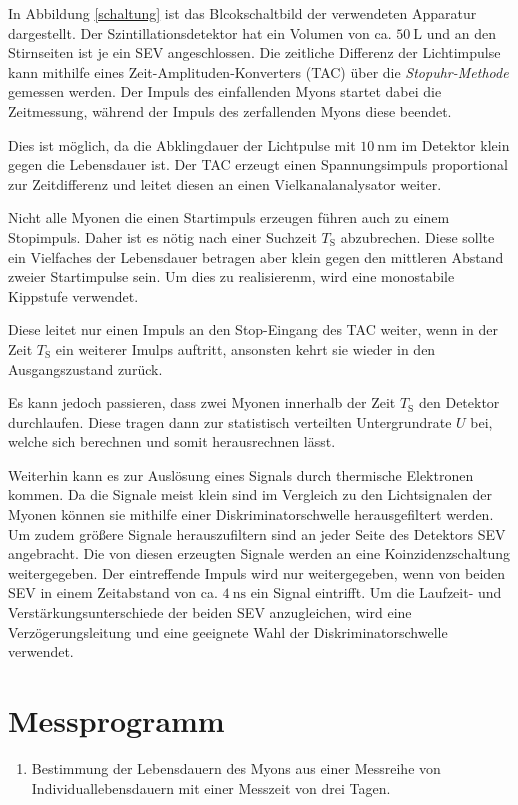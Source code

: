 In Abbildung \ref{schaltung} ist das Blcokschaltbild der verwendeten Apparatur dargestellt.
Der Szintillationsdetektor hat ein Volumen von ca. $\SI{50}{\liter}$ und an den Stirnseiten ist je ein SEV angeschlossen.
Die zeitliche Differenz der Lichtimpulse kann mithilfe eines Zeit-Amplituden-Konverters (TAC) über die \textit{Stopuhr-Methode} gemessen werden.
Der Impuls des einfallenden Myons startet dabei die Zeitmessung, während der Impuls des zerfallenden Myons diese beendet.

Dies ist möglich, da die Abklingdauer der Lichtpulse mit $\SI{10}{\nano\meter}$ im Detektor klein gegen die Lebensdauer ist.
Der TAC erzeugt einen Spannungsimpuls proportional zur Zeitdifferenz und leitet diesen an einen Vielkanalanalysator weiter.

Nicht alle Myonen die einen Startimpuls erzeugen führen auch zu einem Stopimpuls.
Daher ist es nötig nach einer Suchzeit $T_\text{S}$ abzubrechen.
Diese sollte ein Vielfaches der Lebensdauer betragen aber klein gegen den mittleren Abstand zweier Startimpulse sein.
Um dies zu realisierenm, wird eine monostabile Kippstufe verwendet.

Diese leitet nur einen Impuls an den Stop-Eingang des TAC weiter, wenn in der Zeit $T_\text{S}$ ein weiterer Imulps auftritt, ansonsten kehrt sie wieder in den Ausgangszustand zurück.

Es kann jedoch passieren, dass zwei Myonen innerhalb der Zeit $T_\text{S}$ den Detektor durchlaufen.
Diese tragen dann zur statistisch verteilten Untergrundrate $U$ bei, welche sich berechnen und somit herausrechnen lässt.

Weiterhin kann es zur Auslösung eines Signals durch thermische Elektronen kommen.
Da die Signale meist klein sind im Vergleich zu den Lichtsignalen der Myonen können sie mithilfe einer Diskriminatorschwelle herausgefiltert werden.
Um zudem größere Signale herauszufiltern sind an jeder Seite des Detektors SEV angebracht.
Die von diesen erzeugten Signale werden an eine Koinzidenzschaltung weitergegeben.
Der eintreffende Impuls wird nur weitergegeben, wenn von beiden SEV in einem Zeitabstand von ca. $\SI{4}{\nano\second}$ ein Signal eintrifft.
Um die Laufzeit- und Verstärkungsunterschiede der beiden SEV anzugleichen, wird eine Verzögerungsleitung und eine geeignete Wahl der Diskriminatorschwelle verwendet.
\FloatBarrier
\section{Messprogramm} %
\label{sec:messprogramm}

\begin{enumerate}
	\item Bestimmung der Lebensdauern des Myons aus einer Messreihe von Individuallebensdauern mit einer Messzeit von drei Tagen.
\end{enumerate}
